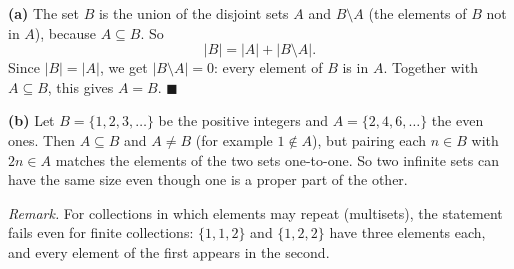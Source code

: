 \textbf{(a)} The set $B$ is the union of the disjoint sets $A$ and $B\setminus A$ (the elements of $B$ not in $A$), because $A\subseteq B$. So
\[|B|=|A|+|B\setminus A| .\]
Since $|B|=|A|$, we get $|B\setminus A|=0$: every element of $B$ is in $A$. Together with $A\subseteq B$, this gives $A=B$. $\blacksquare$

\textbf{(b)} Let $B=\{1,2,3,\dots\}$ be the positive integers and $A=\{2,4,6,\dots\}$ the even ones. Then $A\subseteq B$ and $A\ne B$ (for example $1\notin A$), but pairing each $n\in B$ with $2n\in A$ matches the elements of the two sets one-to-one. So two infinite sets can have the same size even though one is a proper part of the other.

\emph{Remark.} For collections in which elements may repeat (multisets), the statement fails even for finite collections: $\{1,1,2\}$ and $\{1,2,2\}$ have three elements each, and every element of the first appears in the second.
